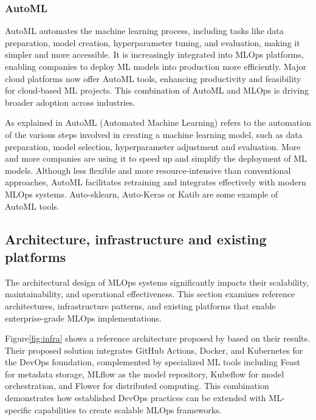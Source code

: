 \subsubsection{AutoML}

AutoML automates the machine learning process, including tasks like data preparation, model creation, hyperparameter tuning, and evaluation,
making it simpler and more accessible.
It is increasingly integrated into MLOps platforms, enabling companies to deploy ML models into production more efficiently.
Major cloud platforms now offer AutoML tools, enhancing productivity and feasibility for cloud-based ML projects.
This combination of AutoML and MLOps is driving broader adoption across industries.\cite{gift2021practical,mlops-definition-tools-and-challenge}

As explained in\cite{mlops-definition-tools-and-challenge} AutoML (Automated Machine Learning) refers to the automation of the various steps involved in creating a machine learning model,
such as data preparation, model selection, hyperparameter adjustment and evaluation.
More and more companies are using it to speed up and simplify the deployment of ML models.
Although less flexible and more resource-intensive than conventional approaches, AutoML facilitates retraining and integrates effectively with modern MLOps systems.
Auto-sklearn, Auto-Keras or Katib are some example of AutoML tools.

\subsection{Architecture, infrastructure and existing platforms}\label{subsec:architecture-infrastructure-and-existing-platforms}
The architectural design of MLOps systems significantly impacts their scalability, maintainability, and operational effectiveness.
This section examines reference architectures, infrastructure patterns, and existing platforms that enable enterprise-grade MLOps implementations.

Figure\ref{fig:infra} shows a reference architecture proposed by\cite{10855428} based on their results.
Their proposed solution integrates GitHub Actions, Docker, and Kubernetes for the DevOps foundation,
complemented by specialized ML tools including Feast for metadata storage, MLflow as the model repository, Kubeflow for model orchestration,
and Flower for distributed computing.
This combination demonstrates how established DevOps practices can be extended with ML-specific capabilities to create scalable MLOps frameworks.

